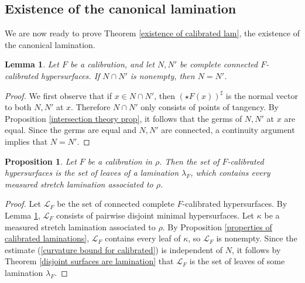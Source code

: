 \documentclass[reqno,11pt]{amsart}
\newtheorem{lemma}[theorem]{Lemma}
\newtheorem{proposition}[theorem]{Proposition}
\theoremstyle{definition}
\numberwithin{equation}{section}
\begin{document}
\subsection{Existence of the canonical lamination}
We are now ready to prove Theorem \ref{existence of calibrated lam}, the existence of the canonical lamination.

\begin{lemma}\label{calibrated implies disjoint}
Let $F$ be a calibration, and let $N, N'$ be complete connected $F$-calibrated hypersurfaces.
If $N \cap N'$ is nonempty, then $N = N'$.
\end{lemma}
\begin{proof}
We first observe that if $x \in N \cap N'$, then $(\star F(x))^\sharp$ is the normal vector to both $N, N'$ at $x$.
Therefore $N \cap N'$ only consists of points of tangency.
By Proposition \ref{intersection theory prop}, it follows that the germs of $N, N'$ at $x$ are equal.
Since the germs are equal and $N, N'$ are connected, a continuity argument implies that $N = N'$.
\end{proof}

\begin{proposition}\label{existence of semicanonical lamination}
Let $F$ be a calibration in $\rho$.
Then the set of $F$-calibrated hypersurfaces is the set of leaves of a lamination $\lambda_F$, which contains every measured stretch lamination associated to $\rho$.
\end{proposition}
\begin{proof}
Let $\mathscr L_F$ be the set of connected complete $F$-calibrated hypersurfaces.
By Lemma \ref{calibrated implies disjoint}, $\mathscr L_F$ consists of pairwise disjoint minimal hypersurfaces.
Let $\kappa$ be a measured stretch lamination associated to $\rho$.
By Proposition \ref{properties of calibrated laminations}, $\mathscr L_F$ contains every leaf of $\kappa$, so $\mathscr L_F$ is nonempty.
Since the estimate (\ref{curvature bound for calibrated}) is independent of $N$, it follows by Theorem \ref{disjoint surfaces are lamination} that $\mathscr L_F$ is the set of leaves of some lamination $\lambda_F$.
\end{proof}
\end{document}
